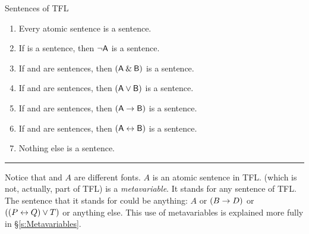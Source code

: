 

\begin{factboxy}{Sentences of TFL}\label{TFLsentences}
	\begin{enumerate}
		\item Every atomic sentence is a sentence.
		\item If  is a sentence, then ${\neg}\mathsf{A}$ is a sentence.
		\item If  and  are sentences, then $(\mathsf{A}\mathbin{\&}\mathsf{B})$ is a sentence.
		\item If  and  are sentences, then $(\mathsf{A}\vee\mathsf{B})$ is a sentence.
		\item If  and  are sentences, then $(\mathsf{A}\rightarrow\mathsf{B})$ is a sentence.
		\item If  and  are sentences, then $(\mathsf{A}\leftrightarrow\mathsf{B})$ is a sentence.
		\item Nothing else is a sentence.
	\end{enumerate}
\hrule
\medskip
\footnotesize{Notice that  and $A$ are different fonts. $A$ is an atomic sentence in TFL.  (which is not, actually, part of TFL) is a \textit{metavariable}. It stands for any sentence of TFL. The sentence that it stands for could be anything: $A$ or $(B \rightarrow D)$ or $((P \leftrightarrow Q) \vee T)$ or anything else. This use of {metavariables} is explained more fully in \S\ref{s:Metavariables}.}
\end{factboxy}

